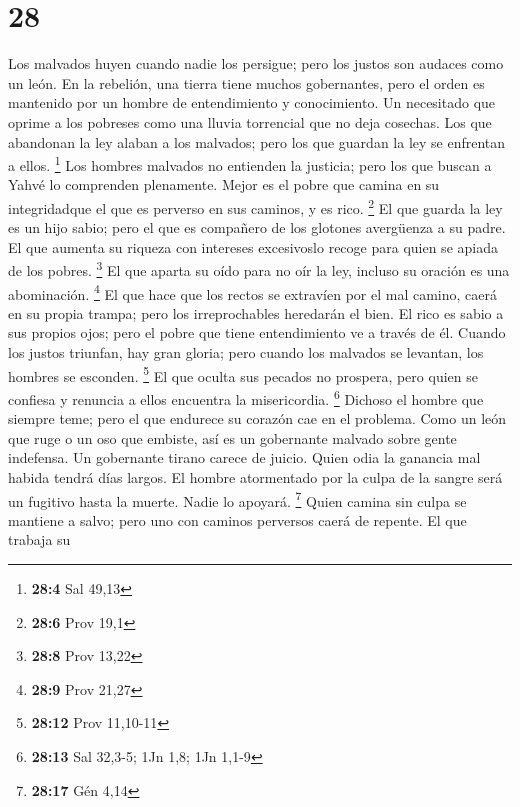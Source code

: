 \hypertarget{section-27}{%
\section{28}\label{section-27}}

 Los malvados huyen cuando nadie los persigue; pero los
justos son audaces como un león.  En la rebelión, una
tierra tiene muchos gobernantes, pero el orden es mantenido por un
hombre de entendimiento y conocimiento.  Un necesitado que
oprime a los pobreses como una lluvia torrencial que no deja cosechas.
 Los que abandonan la ley alaban a los malvados; pero los
que guardan la ley se enfrentan a ellos. \footnote{\textbf{28:4} Sal
  49,13}  Los hombres malvados no entienden la justicia;
pero los que buscan a Yahvé lo comprenden plenamente. 
Mejor es el pobre que camina en su integridadque el que es perverso en
sus caminos, y es rico. \footnote{\textbf{28:6} Prov 19,1}
 El que guarda la ley es un hijo sabio; pero el que es
compañero de los glotones avergüenza a su padre.  El que
aumenta su riqueza con intereses excesivoslo recoge para quien se apiada
de los pobres. \footnote{\textbf{28:8} Prov 13,22}  El que
aparta su oído para no oír la ley, incluso su oración es una
abominación. \footnote{\textbf{28:9} Prov 21,27}  El que
hace que los rectos se extravíen por el mal camino, caerá en su propia
trampa; pero los irreprochables heredarán el bien.  El
rico es sabio a sus propios ojos; pero el pobre que tiene entendimiento
ve a través de él.  Cuando los justos triunfan, hay gran
gloria; pero cuando los malvados se levantan, los hombres se esconden.
\footnote{\textbf{28:12} Prov 11,10-11}  El que oculta
sus pecados no prospera, pero quien se confiesa y renuncia a ellos
encuentra la misericordia. \footnote{\textbf{28:13} Sal 32,3-5; 1Jn 1,8;
  1Jn 1,1-9}  Dichoso el hombre que siempre teme; pero el
que endurece su corazón cae en el problema.  Como un león
que ruge o un oso que embiste, así es un gobernante malvado sobre gente
indefensa.  Un gobernante tirano carece de juicio. Quien
odia la ganancia mal habida tendrá días largos.  El
hombre atormentado por la culpa de la sangre será un fugitivo hasta la
muerte. Nadie lo apoyará. \footnote{\textbf{28:17} Gén 4,14}
 Quien camina sin culpa se mantiene a salvo; pero uno con
caminos perversos caerá de repente.  El que trabaja su
